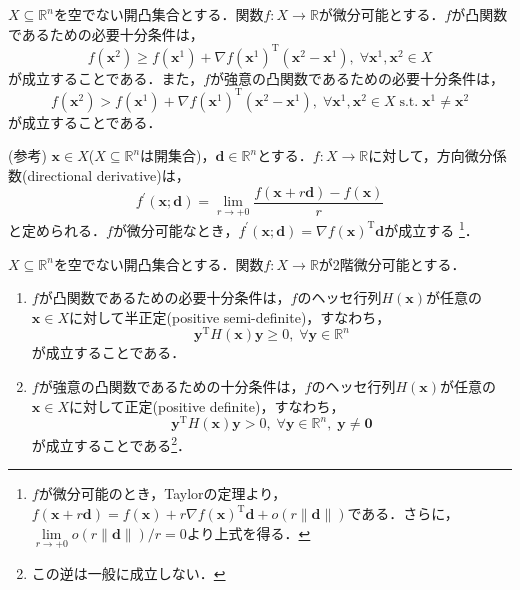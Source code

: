 \documentclass{jsreport}
\begin{document}
\begin{theo}\label{theo:convex}
  $X \subseteq \mathbb{R}^n$を空でない開凸集合とする．関数$f: X \rightarrow \mathbb{R}$が微分可能とする．$f$が凸関数であるための必要十分条件は，
  \begin{equation}
    f(\bm{x}^2) \geq f(\bm{x}^1) + \nabla f(\bm{x}^1)^{\mathrm{T}}(\bm{x}^2 - \bm{x}^1), \; \forall \bm{x}^1, \bm{x}^2 \in X \nonumber
  \end{equation}
  が成立することである．また，$f$が強意の凸関数であるための必要十分条件は，
  \begin{equation}
    f(\bm{x}^2) > f(\bm{x}^1) + \nabla f(\bm{x}^1)^{\mathrm{T}}(\bm{x}^2 - \bm{x}^1), \; \forall \bm{x}^1, \bm{x}^2 \in X \; \mathrm{s. t.} \; \bm{x}^1 \neq \bm{x}^2 \nonumber
  \end{equation}
  が成立することである．
\end{theo}
(参考) $\bm{x} \in X$($X \subseteq \mathbb{R}^n$は開集合)，$\bm{d} \in \mathbb{R}^n$とする．$f: X \rightarrow \mathbb{R}$に対して，方向微分係数(directional derivative)は，
\begin{equation}
  f^{\prime}(\bm{x}; \bm{d}) = \lim_{r \rightarrow +0} \frac{f(\bm{x} + r\bm{d}) - f(\bm{x})}{r} \nonumber
\end{equation}
と定められる．$f$が微分可能なとき，$f^{\prime}(\bm{x}; \bm{d}) = \nabla f(\bm{x})^{\mathrm{T}}\bm{d}$が成立する
\footnote{$f$が微分可能のとき，Taylorの定理より，$f(\bm{x} + r\bm{d}) = f(\bm{x}) + r \nabla f(\bm{x})^{\mathrm{T}} \bm{d} + o(r\|\bm{d}\|)$である．さらに，$\lim \limits_{r \rightarrow +0} o(r\|\bm{d}\|) / r = 0$より上式を得る．}．

\begin{theo}\label{theo:convex2}
  $X \subseteq \mathbb{R}^n$を空でない開凸集合とする．関数$f: X \rightarrow \mathbb{R}$が2階微分可能とする．
  \begin{enumerate}
    \item $f$が凸関数であるための必要十分条件は，$f$のヘッセ行列$H(\bm{x})$が任意の$\bm{x} \in X$に対して半正定(positive semi-definite)，すなわち，
    \begin{equation}
      \bm{y}^{\mathrm{T}} H(\bm{x}) \bm{y} \geq 0, \; \forall \bm{y} \in \mathbb{R}^n \nonumber
    \end{equation}
    が成立することである．
    \item $f$が強意の凸関数であるための十分条件は，$f$のヘッセ行列$H(\bm{x})$が任意の$\bm{x} \in X$に対して正定(positive definite)，すなわち，
    \begin{equation}
      \bm{y}^{\mathrm{T}} H(\bm{x}) \bm{y} > 0, \; \forall \bm{y} \in \mathbb{R}^n, \; \bm{y} \neq \bm{0} \nonumber
    \end{equation}
    が成立することである\footnote{この逆は一般に成立しない．}．
  \end{enumerate}
\end{theo}
\end{document}
